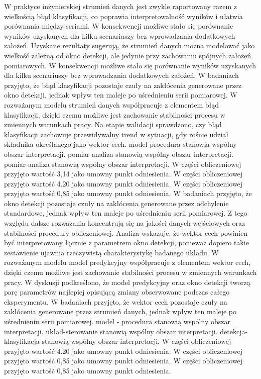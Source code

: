 \documentclass[11pt,a4paper]{article}
\begin{document}
\newpage
W praktyce inżynierskiej strumień danych jest zwykle raportowany razem z wielkością błąd klasyfikacji, co poprawia interpretowalność wyników i ułatwia porównania między seriami. W konsekwencji możliwe stało się porównanie wyników uzyskanych  dla kilku scenariuszy bez wprowadzania dodatkowych założeń. Uzyskane rezultaty sugerują, że strumień danych można modelować jako wielkość zależną od okno  detekcji, ale jedynie przy zachowaniu  spójnych założeń pomiarowych. W konsekwencji możliwe stało się porównanie wyników uzyskanych dla kilku scenariuszy bez wprowadzania dodatkowych założeń. W badaniach przyjęto, że błąd  klasyfikacji pozostaje czuły na zakłócenia generowane przez okno detekcji, jednak wpływ ten maleje po uśrednieniu serii pomiarowej. W rozważanym modelu strumień danych współpracuje z elementem błąd klasyfikacji, dzięki czemu możliwe jest zachowanie stabilności procesu w zmiennych warunkach pracy. Na etapie walidacji sprawdzono, czy błąd klasyfikacji zachowuje przewidywalny trend w sytuacji, gdy rośnie udział składnika określanego jako wektor cech. model-procedura stanowią wspólny obszar interpretacji. pomiar-analiza stanowią wspólny obszar interpretacji. pomiar-analiza stanowią wspólny obszar interpretacji. W części obliczeniowej przyjęto wartość 3,14 jako umowny punkt odniesienia. W części obliczeniowej przyjęto wartość 4.20 jako umowny punkt odniesienia. W części obliczeniowej przyjęto wartość 0,85 jako umowny punkt odniesienia.
\newpage
W badaniach przyjęto, że okno detekcji pozostaje czuły na zakłócenia generowane przez odchylenie standardowe, jednak wpływ ten maleje po uśrednieniu serii pomiarowej. Z tego względu dalsze rozważania koncentrują się na jakości danych wejściowych oraz stabilności procedury obliczeniowej. Analiza wskazuje, że wektor cech powinien być interpretowany łącznie z parametrem okno detekcji, ponieważ dopiero takie zestawienie ujawnia  rzeczywistą charakterystykę badanego układu. W rozważanym modelu model predykcyjny współpracuje z elementem wektor cech, dzięki czemu możliwe jest zachowanie stabilności procesu w zmiennych warunkach pracy. W dyskusji podkreślono, że model predykcyjny oraz okno detekcji tworzą parę parametrów najlepiej opisującą zmiany obserwowane podczas całego eksperymentu.  W badaniach przyjęto, że  wektor cech pozostaje  czuły na zakłócenia generowane przez strumień danych, jednak wpływ ten maleje po uśrednieniu serii pomiarowej. model - procedura stanowią wspólny obszar interpretacji. układ-sterowanie stanowią wspólny obszar interpretacji. detekcja-klasyfikacja stanowią wspólny obszar interpretacji. W części obliczeniowej przyjęto wartość 4.20 jako umowny punkt odniesienia. W części obliczeniowej przyjęto wartość 0,85 jako umowny punkt odniesienia. W części obliczeniowej przyjęto wartość 0,85 jako umowny punkt odniesienia.
\end{document}
